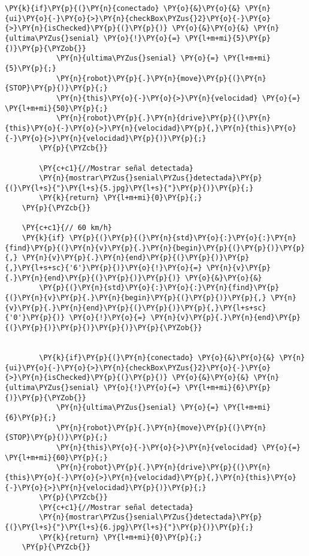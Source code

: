 \begin{Verbatim}[commandchars=\\\{\}]
        \PY{k}{if}\PY{p}{(}\PY{n}{conectado} \PY{o}{&}\PY{o}{&} \PY{n}{ui}\PY{o}{-}\PY{o}{>}\PY{n}{checkBox\PYZus{}2}\PY{o}{-}\PY{o}{>}\PY{n}{isChecked}\PY{p}{(}\PY{p}{)} \PY{o}{&}\PY{o}{&} \PY{n}{ultima\PYZus{}senial} \PY{o}{!}\PY{o}{=} \PY{l+m+mi}{5}\PY{p}{)}\PY{p}{\PYZob{}}
            \PY{n}{ultima\PYZus{}senial} \PY{o}{=} \PY{l+m+mi}{5}\PY{p}{;}
            \PY{n}{robot}\PY{p}{.}\PY{n}{move}\PY{p}{(}\PY{n}{STOP}\PY{p}{)}\PY{p}{;}
            \PY{n}{this}\PY{o}{-}\PY{o}{>}\PY{n}{velocidad} \PY{o}{=} \PY{l+m+mi}{50}\PY{p}{;}
            \PY{n}{robot}\PY{p}{.}\PY{n}{drive}\PY{p}{(}\PY{n}{this}\PY{o}{-}\PY{o}{>}\PY{n}{velocidad}\PY{p}{,}\PY{n}{this}\PY{o}{-}\PY{o}{>}\PY{n}{velocidad}\PY{p}{)}\PY{p}{;}
        \PY{p}{\PYZcb{}}

        \PY{c+c1}{//Mostrar señal detectada}
        \PY{n}{mostrar\PYZus{}senial\PYZus{}detectada}\PY{p}{(}\PY{l+s}{"}\PY{l+s}{5.jpg}\PY{l+s}{"}\PY{p}{)}\PY{p}{;}
        \PY{k}{return} \PY{l+m+mi}{0}\PY{p}{;}
    \PY{p}{\PYZcb{}}

    \PY{c+c1}{// 60 km/h}
    \PY{k}{if} \PY{p}{(}\PY{p}{(}\PY{n}{std}\PY{o}{:}\PY{o}{:}\PY{n}{find}\PY{p}{(}\PY{n}{v}\PY{p}{.}\PY{n}{begin}\PY{p}{(}\PY{p}{)}\PY{p}{,} \PY{n}{v}\PY{p}{.}\PY{n}{end}\PY{p}{(}\PY{p}{)}\PY{p}{,}\PY{l+s+sc}{'6'}\PY{p}{)}\PY{o}{!}\PY{o}{=} \PY{n}{v}\PY{p}{.}\PY{n}{end}\PY{p}{(}\PY{p}{)}\PY{p}{)} \PY{o}{&}\PY{o}{&} 
        \PY{p}{(}\PY{n}{std}\PY{o}{:}\PY{o}{:}\PY{n}{find}\PY{p}{(}\PY{n}{v}\PY{p}{.}\PY{n}{begin}\PY{p}{(}\PY{p}{)}\PY{p}{,} \PY{n}{v}\PY{p}{.}\PY{n}{end}\PY{p}{(}\PY{p}{)}\PY{p}{,}\PY{l+s+sc}{'0'}\PY{p}{)} \PY{o}{!}\PY{o}{=} \PY{n}{v}\PY{p}{.}\PY{n}{end}\PY{p}{(}\PY{p}{)}\PY{p}{)}\PY{p}{)}\PY{p}{\PYZob{}}


        \PY{k}{if}\PY{p}{(}\PY{n}{conectado} \PY{o}{&}\PY{o}{&} \PY{n}{ui}\PY{o}{-}\PY{o}{>}\PY{n}{checkBox\PYZus{}2}\PY{o}{-}\PY{o}{>}\PY{n}{isChecked}\PY{p}{(}\PY{p}{)} \PY{o}{&}\PY{o}{&} \PY{n}{ultima\PYZus{}senial} \PY{o}{!}\PY{o}{=} \PY{l+m+mi}{6}\PY{p}{)}\PY{p}{\PYZob{}}
            \PY{n}{ultima\PYZus{}senial} \PY{o}{=} \PY{l+m+mi}{6}\PY{p}{;}
            \PY{n}{robot}\PY{p}{.}\PY{n}{move}\PY{p}{(}\PY{n}{STOP}\PY{p}{)}\PY{p}{;}
            \PY{n}{this}\PY{o}{-}\PY{o}{>}\PY{n}{velocidad} \PY{o}{=} \PY{l+m+mi}{60}\PY{p}{;}
            \PY{n}{robot}\PY{p}{.}\PY{n}{drive}\PY{p}{(}\PY{n}{this}\PY{o}{-}\PY{o}{>}\PY{n}{velocidad}\PY{p}{,}\PY{n}{this}\PY{o}{-}\PY{o}{>}\PY{n}{velocidad}\PY{p}{)}\PY{p}{;}
        \PY{p}{\PYZcb{}}
        \PY{c+c1}{//Mostrar señal detectada}
        \PY{n}{mostrar\PYZus{}senial\PYZus{}detectada}\PY{p}{(}\PY{l+s}{"}\PY{l+s}{6.jpg}\PY{l+s}{"}\PY{p}{)}\PY{p}{;}
        \PY{k}{return} \PY{l+m+mi}{0}\PY{p}{;}
    \PY{p}{\PYZcb{}}


\end{Verbatim}

